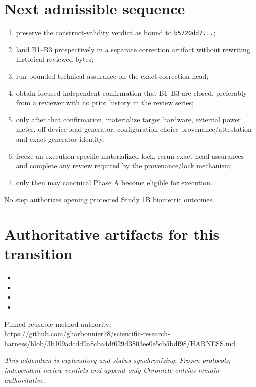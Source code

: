 \documentclass[10pt,a4paper]{article}
\newcommand{\code}[1]{\texttt{#1}}
\begin{document}
\section{Next admissible sequence}

\begin{enumerate}
\item preserve the construct-validity verdict as bound to \code{b5720dd7...};
\item land B1--B3 prospectively in a separate correction artifact without rewriting historical reviewed bytes;
\item run bounded technical assurance on the exact correction head;
\item obtain focused independent confirmation that B1--B3 are closed, preferably from a reviewer with no prior history
in the review series;
\item only after that confirmation, materialize target hardware, external power meter, off-device load generator,
configuration-choice provenance/attestation and exact generator identity;
\item freeze an execution-specific materialized lock, rerun exact-head assurances and complete any review required by the
provenance/lock mechanism;
\item only then may canonical Phase A become eligible for execution.
\end{enumerate}

No step authorizes opening protected Study 1B biometric outcomes.

\section{Authoritative artifacts for this transition}

\begin{itemize}
\item {}
\item {}
\item {}
\item {}
\end{itemize}

Pinned reusable method authority:\\
\url{https://github.com/gharbonnier78/scientific-research-harness/blob/3b109adcdd9a8cba4df029d3803ee0e5cb5bdf98/HARNESS.md}

\vfill
\begin{center}
\small\textit{This addendum is explanatory and status-synchronizing. Frozen protocols, independent review verdicts and
append-only Chronicle entries remain authoritative.}
\end{center}
\end{document}

